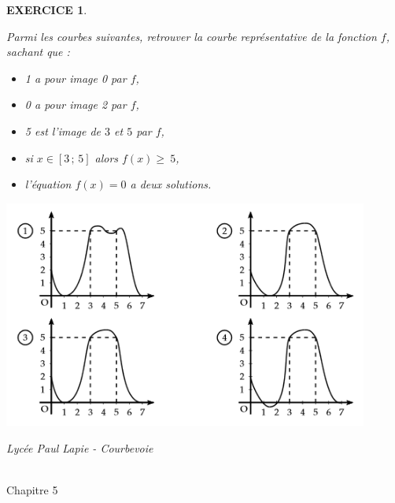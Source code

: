 \documentclass[a4paper]{article}   %
\renewcommand{\(}{\left(}
\renewcommand{\)}{\right)}
\newtheorem{EXO}{\large EXERCICE }
\newenvironment{EX}   { \setcounter{ques}{0} \begin{EXO} \hrulefill ~\vspace{0.3cm}

\normalfont}    {\end{EXO} \medskip}
\newcommand{\se}{\geqslant~} 		%
\def\cl{{\Large \bf{2nde}}}
\begin{document}
\begin{EX}
Parmi les courbes suivantes, retrouver la courbe représentative de la fonction $f$, sachant que :
\begin{itemize}
\item 1 a pour image 0 par $f$,
\item 0 a pour image 2 par $f$,
\item 5 est l'image de $3$ et $5$ par $f$,
\item si $x\in [3\,;\,5]$ alors $f(x) \se 5$,
\item l'équation $f(x)=0$ a deux solutions.
\end{itemize}
\begin{center}
\includegraphics[width=12cm]{3ex1.png}
\end{center}
\end{EX}






\newpage \setcounter{EXO}{0}


\noindent\begin{minipage}{.20\linewidth}\begin{center}                  
\noindent \emph{Lycée Paul Lapie - Courbevoie}
\end{center}\end{minipage}
\begin{minipage}{1.5\linewidth}\begin{center}	
\noindent \cl\\ Chapitre 5
\end{center}\end{minipage}
\end{document}
